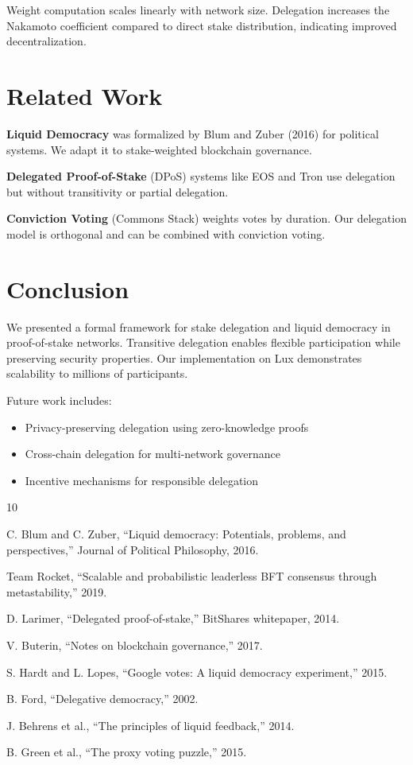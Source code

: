 \documentclass[11pt,a4paper]{article}
\begin{document}
Weight computation scales linearly with network size. Delegation increases the Nakamoto coefficient compared to direct stake distribution, indicating improved decentralization.

\section{Related Work}

\textbf{Liquid Democracy} was formalized by Blum and Zuber (2016) for political systems. We adapt it to stake-weighted blockchain governance.

\textbf{Delegated Proof-of-Stake} (DPoS) systems like EOS and Tron use delegation but without transitivity or partial delegation.

\textbf{Conviction Voting} (Commons Stack) weights votes by duration. Our delegation model is orthogonal and can be combined with conviction voting.

\section{Conclusion}

We presented a formal framework for stake delegation and liquid democracy in proof-of-stake networks. Transitive delegation enables flexible participation while preserving security properties. Our implementation on Lux demonstrates scalability to millions of participants.

Future work includes:
\begin{itemize}
    \item Privacy-preserving delegation using zero-knowledge proofs
    \item Cross-chain delegation for multi-network governance
    \item Incentive mechanisms for responsible delegation
\end{itemize}


\begin{thebibliography}{10}

C. Blum and C. Zuber, ``Liquid democracy: Potentials, problems, and perspectives,'' Journal of Political Philosophy, 2016.

Team Rocket, ``Scalable and probabilistic leaderless BFT consensus through metastability,'' 2019.

D. Larimer, ``Delegated proof-of-stake,'' BitShares whitepaper, 2014.

V. Buterin, ``Notes on blockchain governance,'' 2017.

S. Hardt and L. Lopes, ``Google votes: A liquid democracy experiment,'' 2015.

B. Ford, ``Delegative democracy,'' 2002.

J. Behrens et al., ``The principles of liquid feedback,'' 2014.

B. Green et al., ``The proxy voting puzzle,'' 2015.

\end{thebibliography}
\end{document}
